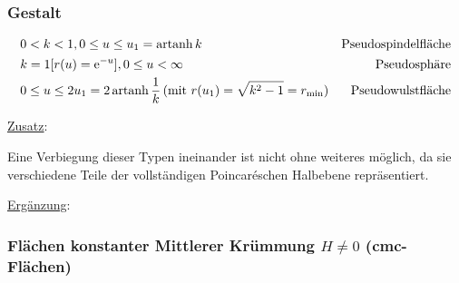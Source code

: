 \subsubsection{Gestalt}
\begin{align*}
 &0 < k < 1, 0 \le u \le u_1 = \operatorname{artanh} k & \text{Pseudospindelfläche} \\
 &k = 1 [r(u) = \operatorname{e}^{-u}], 0 \le u < \infty & \text{Pseudosphäre} \\
 &0 \le u \le 2 u_1 = 2 \operatorname{artanh} \frac{1}{k} \,(\text{mit } r(u_1) = \sqrt{k^2 - 1} = r_\text{min}) & \text{Pseudowulstfläche}
\end{align*}

\uline{Zusatz}: \par
Eine Verbiegung dieser Typen ineinander ist nicht ohne weiteres möglich, da sie verschiedene Teile der vollständigen Poincaréschen Halbebene repräsentiert.

\uline{Ergänzung}: \par
\subsubsection{Flächen konstanter Mittlerer Krümmung \(H \ne 0\) (cmc-Flächen)}

